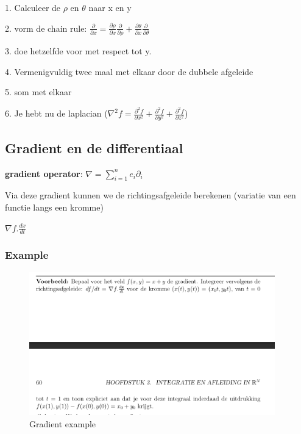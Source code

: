 \documentclass[a4paper]{article}
\begin{document}
1. Calculeer de $\rho$ en $\theta$ naar x en y

2. vorm de chain rule: $\frac{\partial}{\partial x} = \frac{\partial \rho}{\partial x} \frac{\partial}{\partial \rho} + \frac{\partial \theta}{\partial x} \frac{\partial}{\partial \theta}$

3. doe hetzelfde voor met respect tot y.

4. Vermenigvuldig twee maal met elkaar door de dubbele afgeleide

5. som met elkaar

6. Je hebt nu de laplacian ($\nabla^2 f = \frac{\partial^2 f}{\partial x^2} + \frac{\partial^2 f}{\partial y^2} + \frac{\partial^2 f}{\partial z^2}$)

\subsection{Gradient en de differentiaal}

\textbf{gradient operator}: $\nabla = \sum_{i=1}^{n} e_i \partial_i$

Via deze gradient kunnen we de richtingsafgeleide berekenen (variatie van een functie langs een kromme)

$\nabla f . \frac{dx}{dt}$

\subsubsection{Example}

\begin{figure}[H]
	\begin{center}
		\includegraphics[width=0.95\textwidth]{./images/gradient.png}
	\end{center}
	\caption{Gradient example}
	\label{}
\end{figure}
\end{document}
